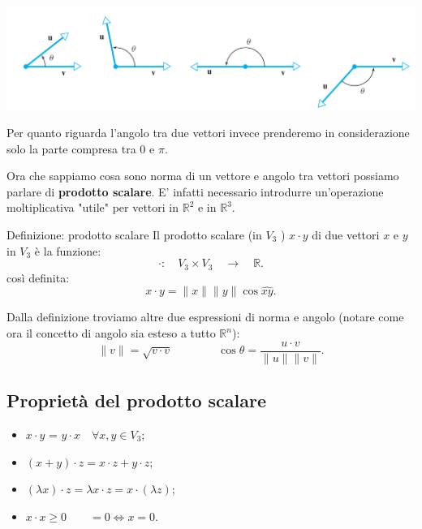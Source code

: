 \documentclass[x11names]{article}
\begin{document}
\begin{center}
\includegraphics[scale=0.25]{figures/angoli.png}
\end{center}
Per quanto riguarda l'angolo tra due vettori invece prenderemo in considerazione solo la parte compresa tra $0$ e $\pi$.


Ora che sappiamo cosa sono norma di un vettore e angolo tra vettori possiamo parlare di \textbf{prodotto scalare}. E' infatti necessario introdurre un'operazione moltiplicativa "utile" per vettori in $\mathbb{R}^2$ e in $\mathbb{R}^3$.

\begin{center}
\colorbox{Azure2}{\begin{minipage}{5.75in}
\begin{blues}{Definizione: prodotto scalare}
Il prodotto scalare (in $V_3$ ) $x\cdot y$ di due vettori $x$ e $y$ in $V_3$ è la funzione:
\[
\cdot : \quad V_3 \times V_3 \quad \longrightarrow \quad \mathbb{R}
.\] 
così definita:
\[
x \cdot y  = \|x\| \|y\| \cos{\hat{xy}}
.\] 

\end{blues}
\end{minipage}}        
\end{center}

Dalla definizione troviamo altre due espressioni di norma e angolo (notare come ora il concetto di angolo sia esteso a tutto $\mathbb{R}^n$):
\[
\|v\| = \sqrt{v\cdot v} \qquad \qquad \cos{\theta} = \frac{u\cdot v}{\|u\|\|v\|}
.\]

\subsection{Proprietà del prodotto scalare}
\begin{itemize}
	\item $x \cdot y$ = $y \cdot x \quad \forall x,y \in V_3$;
	\item $\left(x + y\right)\cdot z = x\cdot z + y\cdot z$;
	\item $\left(\lambda x\right)\cdot z = \lambda x \cdot z = x \cdot \left(\lambda z\right)$;
	\item $x\cdot x \geq 0 \qquad = 0 \Longleftrightarrow x = 0$.
\end{itemize}
\end{document}
